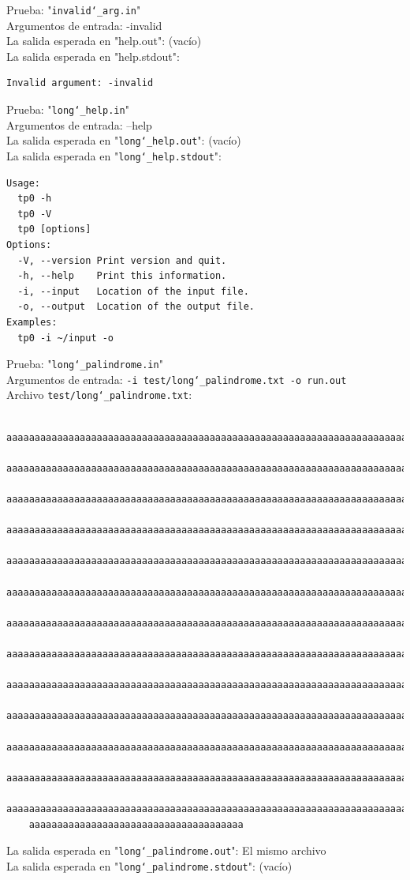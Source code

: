 \documentclass[a4paper,10pt]{article}
\begin{document}
Prueba: "\texttt{invalid\char`_arg.in}" \\
    Argumentos de entrada: -invalid\\
    La salida esperada en "help.out": (vacío)\\
    La salida esperada en "help.stdout":
        \begin{Verbatim}
Invalid argument: -invalid
  \end{Verbatim}
  
  Prueba: "\texttt{long\char`_help.in}" \\
    Argumentos de entrada: --help\\
    La salida esperada en "\texttt{long\char`_help.out}": (vacío)\\
    La salida esperada en "\texttt{long\char`_help.stdout}":
        \begin{Verbatim}
Usage:
  tp0 -h
  tp0 -V
  tp0 [options]
Options:
  -V, --version Print version and quit.
  -h, --help    Print this information.
  -i, --input   Location of the input file.
  -o, --output  Location of the output file.
Examples:
  tp0 -i ~/input -o
  \end{Verbatim}
  
    Prueba: "\texttt{long\char`_palindrome.in}" \\
    Argumentos de entrada: \texttt{-i test/long\char`_palindrome.txt -o run.out}\\
    Archivo \texttt{test/long\char`_palindrome.txt}: \\
    \begin{Verbatim}
    aaaaaaaaaaaaaaaaaaaaaaaaaaaaaaaaaaaaaaaaaaaaaaaaaaaaaaaaaaaaaaaaaaaaaaaaaa
    aaaaaaaaaaaaaaaaaaaaaaaaaaaaaaaaaaaaaaaaaaaaaaaaaaaaaaaaaaaaaaaaaaaaaaaaaa
    aaaaaaaaaaaaaaaaaaaaaaaaaaaaaaaaaaaaaaaaaaaaaaaaaaaaaaaaaaaaaaaaaaaaaaaaaa
    aaaaaaaaaaaaaaaaaaaaaaaaaaaaaaaaaaaaaaaaaaaaaaaaaaaaaaaaaaaaaaaaaaaaaaaaaa
    aaaaaaaaaaaaaaaaaaaaaaaaaaaaaaaaaaaaaaaaaaaaaaaaaaaaaaaaaaaaaaaaaaaaaaaaaa
    aaaaaaaaaaaaaaaaaaaaaaaaaaaaaaaaaaaaaaaaaaaaaaaaaaaaaaaaaaaaaaaaaaaaaaaaaa
    aaaaaaaaaaaaaaaaaaaaaaaaaaaaaaaaaaaaaaaaaaaaaaaaaaaaaaaaaaaaaaaaaaaaaaaaaa
    aaaaaaaaaaaaaaaaaaaaaaaaaaaaaaaaaaaaaaaaaaaaaaaaaaaaaaaaaaaaaaaaaaaaaaaaaa
    aaaaaaaaaaaaaaaaaaaaaaaaaaaaaaaaaaaaaaaaaaaaaaaaaaaaaaaaaaaaaaaaaaaaaaaaaa
    aaaaaaaaaaaaaaaaaaaaaaaaaaaaaaaaaaaaaaaaaaaaaaaaaaaaaaaaaaaaaaaaaaaaaaaaaa
    aaaaaaaaaaaaaaaaaaaaaaaaaaaaaaaaaaaaaaaaaaaaaaaaaaaaaaaaaaaaaaaaaaaaaaaaaa
    aaaaaaaaaaaaaaaaaaaaaaaaaaaaaaaaaaaaaaaaaaaaaaaaaaaaaaaaaaaaaaaaaaaaaaaaaa
    aaaaaaaaaaaaaaaaaaaaaaaaaaaaaaaaaaaaaaaaaaaaaaaaaaaaaaaaaaaaaaaaaaaaaaaaaa
    aaaaaaaaaaaaaaaaaaaaaaaaaaaaaaaaaaaaaa
    \end{Verbatim}
    La salida esperada en "\texttt{long\char`_palindrome.out}": El mismo archivo\\
    La salida esperada en "\texttt{long\char`_palindrome.stdout}": (vacío)\\
  
\end{document}
